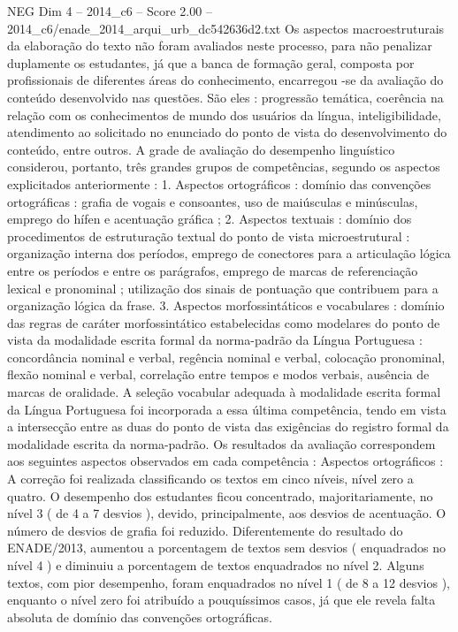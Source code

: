\begin{textsample}{NEG Dim 4 – 2014\_c6 – Score 2.00 – 2014\_c6/enade\_2014\_arqui\_urb\_dc542636d2.txt}
Os aspectos macroestruturais da elaboração do texto não foram avaliados neste processo, para não penalizar duplamente os estudantes, já que a banca de formação geral, composta por profissionais de diferentes áreas do conhecimento, encarregou -se da avaliação do conteúdo desenvolvido nas questões.
São eles : progressão temática, coerência na relação com os conhecimentos de mundo dos usuários da língua, inteligibilidade, atendimento ao solicitado no enunciado do ponto de vista do desenvolvimento do conteúdo, entre outros.
A grade de avaliação do desempenho linguístico considerou, portanto, três grandes grupos de competências, segundo os aspectos explicitados anteriormente : 1.
Aspectos ortográficos : domínio das convenções ortográficas : grafia de vogais e consoantes, uso de maiúsculas e minúsculas, emprego do hífen e acentuação gráfica ; 2.
Aspectos textuais : domínio dos procedimentos de estruturação textual do ponto de vista microestrutural : organização interna dos períodos, emprego de conectores para a articulação lógica entre os períodos e entre os parágrafos, emprego de marcas de referenciação lexical e pronominal ; utilização dos sinais de pontuação que contribuem para a organização lógica da frase. 3.
Aspectos morfossintáticos e vocabulares : domínio das regras de caráter morfossintático estabelecidas como modelares do ponto de vista da modalidade escrita formal da norma-padrão da Língua Portuguesa : concordância nominal e verbal, regência nominal e verbal, colocação pronominal, flexão nominal e verbal, correlação entre tempos e modos verbais, ausência de marcas de oralidade.
A seleção vocabular adequada à modalidade escrita formal da Língua Portuguesa foi incorporada a essa última competência, tendo em vista a intersecção entre as duas do ponto de vista das exigências do registro formal da modalidade escrita da norma-padrão.
Os resultados da avaliação correspondem aos seguintes aspectos observados em cada competência : Aspectos ortográficos : A correção foi realizada classificando os textos em cinco níveis, nível zero a quatro.
O desempenho dos estudantes ficou concentrado, majoritariamente, no nível 3 ( de 4 a 7 desvios ), devido, principalmente, aos desvios de acentuação.
O número de desvios de grafia foi reduzido.
Diferentemente do resultado do ENADE/2013, aumentou a porcentagem de textos sem desvios ( enquadrados no nível 4 ) e diminuiu a porcentagem de textos enquadrados no nível 2.
Alguns textos, com pior desempenho, foram enquadrados no nível 1 ( de 8 a 12 desvios ), enquanto o nível zero foi atribuído a pouquíssimos casos, já que ele revela falta absoluta de domínio das convenções ortográficas.

\end{textsample}
